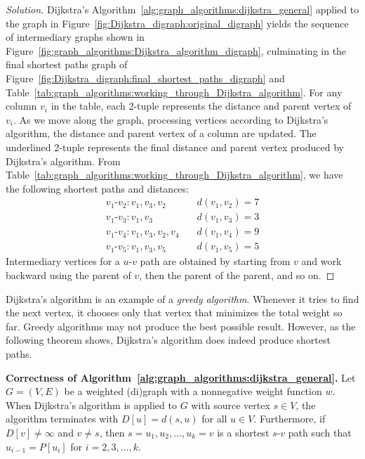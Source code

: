 \begin{proof}[Solution]
Dijkstra's Algorithm~\ref{alg:graph_algorithms:dijkstra_general}
applied to the graph in
Figure~\ref{fig:Dijkstra_digraph:original_digraph} yields the sequence
of intermediary graphs shown in
Figure~\ref{fig:graph_algorithms:Dijkstra_algorithm_digraph},
culminating in the final shortest paths graph of
Figure~\ref{fig:Dijkstra_digraph:final_shortest_paths_digraph} and
Table~\ref{tab:graph_algorithms:working_through_Dijkstra_algorithm}. For
any column $v_i$ in the table, each 2-tuple represents the
distance and parent vertex of $v_i$. As we move along
the graph, processing vertices according to Dijkstra's
algorithm, the distance and parent vertex
of a column are updated. The underlined 2-tuple represents the final
distance and parent vertex produced by Dijkstra's algorithm. From
Table~\ref{tab:graph_algorithms:working_through_Dijkstra_algorithm},
we have the following shortest paths and distances:
\[
\begin{array}{ll}
v_1\text{-}v_2: v_1, v_3, v_2      &\quad d(v_1, v_2) = 7 \\[4pt]
v_1\text{-}v_3: v_1, v_3           &\quad d(v_1, v_3) = 3 \\[4pt]
v_1\text{-}v_4: v_1, v_3, v_2, v_4 &\quad d(v_1, v_4) = 9 \\[4pt]
v_1\text{-}v_5: v_1, v_3, v_5      &\quad d(v_1, v_5) = 5
\end{array}
\]
Intermediary vertices for a $u$-$v$ path are obtained by starting from
$v$ and work backward using the parent of $v$, then the parent of the
parent, and so on.
\end{proof}

Dijkstra's algorithm is an example of a
\emph{greedy algorithm}. Whenever it tries to
find the next vertex, it chooses only that vertex that minimizes the
total weight so far. Greedy
algorithms may not produce the best possible
result. However, as the following theorem shows, Dijkstra's
algorithm does indeed produce shortest
paths.

\begin{theorem}
\textbf{Correctness of
  Algorithm~\ref{alg:graph_algorithms:dijkstra_general}.}
Let $G = (V, E)$ be a weighted (di)graph with a nonnegative
weight function $w$. When Dijkstra's
algorithm is applied to $G$ with source
vertex $s \in V$, the algorithm terminates with $D[u] = d(s,u)$ for
all $u \in V$. Furthermore, if $D[v] \neq \infty$ and $v \neq s$, then
$s=u_1, u_2, \dots, u_k = v$ is a shortest $s$-$v$ path such that
$u_{i-1} = P[u_i]$ for $i = 2,3,\dots,k$.
\end{theorem}

